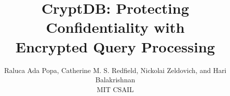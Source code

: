 \documentclass[9pt,twocolumn]{article}
\begin{document}
\title{\bf CryptDB: Protecting Confidentiality with \\
	   Encrypted Query Processing}
\author{Raluca Ada Popa, Catherine M. S. Redfield,
	Nickolai Zeldovich, and Hari Balakrishnan \\
	MIT CSAIL}
\date{}

\newcommand{\RND}{\textrm{RND}}
\newcommand{\DET}{\textrm{DET}}
\newcommand{\OPE}{\textrm{OPE}}
\newcommand{\OPEJOIN}{\textrm{OPE-JOIN}}
\newcommand{\HOM}{\textrm{HOM}}
\newcommand{\JOIN}{\textrm{JOIN}}
\newcommand{\SEARCH}{\textrm{SEARCH}}

\newcommand{\up}{\texttt{UPDATE}}
\newcommand{\ins}{\texttt{INSERT}}
\newcommand{\del}{\texttt{DELETE}}
\newcommand{\sel}{\texttt{SELECT}}

\newcommand{\rap}[1]{\textcolor{blue}{RAP: #1}}
\newcommand{\hb}[1]{\textcolor{red}{HB: #1}}
\newcommand{\nz}[1]{\textcolor{magenta}{NZ: #1}}
\newcommand{\cmsr}[1]{\textcolor{green}{CR: #1}}
\newcommand{\todo}[1]{\textcolor{red}{#1}}


\newcommand{\tput}{27\%}

\newtheorem{definition}{Definition}
\newtheorem{theorem}{Theorem}

\maketitle







 





{
\small
\setlength{\bibsep}{3pt}


}
\end{document}
